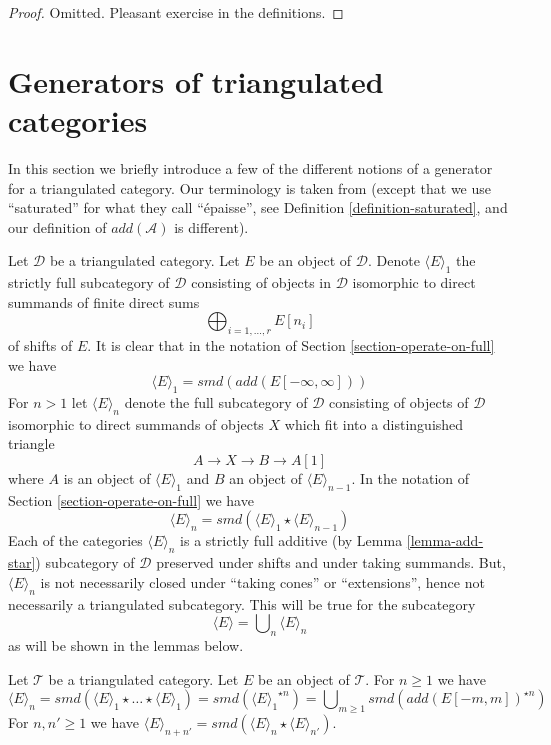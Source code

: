 \begin{proof}
Omitted. Pleasant exercise in the definitions.
\end{proof}





\section{Generators of triangulated categories}
\label{section-generators}

\noindent
In this section we briefly introduce a few of the different notions
of a generator for a triangulated category. Our terminology is
taken from \cite{BvdB} (except that we use ``saturated'' for what
they call ``\'epaisse'', see Definition \ref{definition-saturated}, and
our definition of $add(\mathcal{A})$ is different).

\medskip\noindent
Let $\mathcal{D}$ be a triangulated category. Let $E$ be an object
of $\mathcal{D}$. Denote $\langle E \rangle_1$ the strictly full subcategory
of $\mathcal{D}$ consisting of objects in $\mathcal{D}$ isomorphic to
direct summands of finite direct sums
$$
\bigoplus\nolimits_{i = 1, \ldots, r} E[n_i]
$$
of shifts of $E$. It is clear that in the notation of
Section \ref{section-operate-on-full} we have
$$
\langle E \rangle_1 = smd(add(E[-\infty, \infty]))
$$
For $n > 1$ let $\langle E \rangle_n$ denote the full
subcategory of $\mathcal{D}$ consisting of objects of $\mathcal{D}$
isomorphic to direct summands of objects $X$ which fit into a distinguished
triangle
$$
A \to X \to B \to A[1]
$$
where $A$ is an object of $\langle E \rangle_1$ and $B$ an object of
$\langle E \rangle_{n - 1}$. In the notation of
Section \ref{section-operate-on-full} we have
$$
\langle E \rangle_n = smd(\langle E \rangle_1 \star \langle E \rangle_{n - 1})
$$
Each of the categories $\langle E \rangle_n$ is a strictly full additive
(by Lemma \ref{lemma-add-star}) subcategory of $\mathcal{D}$ preserved
under shifts and under taking summands. But, $\langle E \rangle_n$ is not
necessarily closed under ``taking cones'' or ``extensions'', hence not
necessarily a triangulated subcategory. This will be true for the
subcategory
$$
\langle E \rangle = \bigcup\nolimits_n \langle E \rangle_n
$$
as will be shown in the lemmas below.

\begin{lemma}
\label{lemma-generated-by-E-explicit}
Let $\mathcal{T}$ be a triangulated category. Let $E$ be an object
of $\mathcal{T}$. For $n \geq 1$ we have
$$
\langle E \rangle_n =
smd(\langle E \rangle_1 \star \ldots \star \langle E \rangle_1) =
smd({\langle E \rangle_1}^{\star n}) =
\bigcup\nolimits_{m \geq 1} smd(add(E[-m, m])^{\star n})
$$
For $n, n' \geq 1$ we have $\langle E \rangle_{n + n'} =
smd(\langle E \rangle_n \star \langle E \rangle_{n'})$.
\end{lemma}

